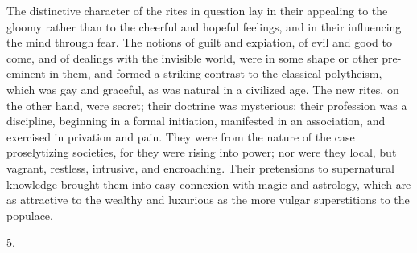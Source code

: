 The distinctive character of the rites in question lay
in their appealing to the gloomy rather than to the
cheerful and hopeful feelings, and in their influencing
the mind through fear. The notions of guilt and
expiation, of evil and good to come, and of dealings with
the invisible world, were in some shape or other
pre-eminent in them, and formed a striking contrast to
the classical polytheism, which was gay and graceful, as
was natural in a civilized age. The new rites, on the
other hand, were secret; their doctrine was mysterious;
their profession was a discipline, beginning in a formal
initiation, manifested in an association, and exercised
in privation and pain. They were from the nature of the
case proselytizing societies, for they were rising into
power; nor were they local, but vagrant, restless,
intrusive, and encroaching. Their pretensions to
supernatural knowledge brought them into easy connexion
with magic and astrology, which are as attractive to the
wealthy and luxurious as the more vulgar superstitions to
the populace.

5.

